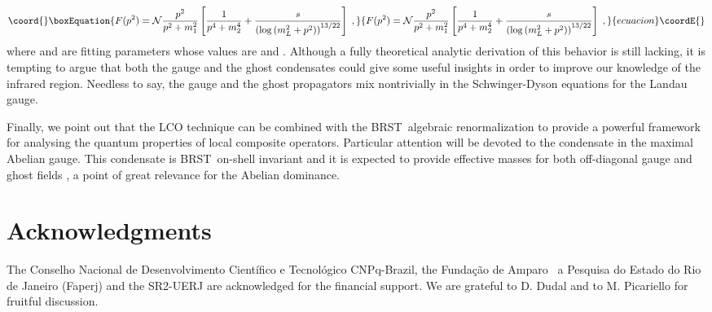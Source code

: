 \documentclass[a4paper,12pt]{article}
\begin{document}
\begin{equation}\coord{}\boxEquation{
F(p^{2})=\mathcal{N}\frac{p^{2}}{p^{2}+m_{1}^{2}}\left[ \frac{1}{
p^{4}+m_{2}^{4}}+\frac{s}{\left( \log \left( m_{L}^{2}+p^{2}\right) \right)
^{13/22}}\right] \;,  \label{fp}
}{
F(p^{2})=\mathcal{N}\frac{p^{2}}{p^{2}+m_{1}^{2}}\left[ \frac{1}{
p^{4}+m_{2}^{4}}+\frac{s}{\left( \log \left( m_{L}^{2}+p^{2}\right) \right)
^{13/22}}\right] \;,  }{ecuacion}\coordE{}\end{equation}
where \coordHE{}  \coordHE{}and \coordHE{}are fitting
parameters \cite{lg} whose values are \coordHE{}and \coordHE{}. Although a fully theoretical analytic derivation of this
behavior is still lacking, it is tempting to argue that both the gauge \coordHE{}and the ghost condensates \coordHE{} could give some useful insights
in order to improve our knowledge of the infrared region. Needless to say,
the gauge and the ghost propagators mix nontrivially in the Schwinger-Dyson
equations for the Landau gauge.

Finally, we point out that the LCO technique can be combined with the BRST\
algebraic renormalization to provide a powerful framework for analysing the
quantum properties of local composite operators. Particular attention will
be devoted to the condensate \myHighlight{$\left( \frac{1}{2}\left\langle AA\right\rangle
-\xi \left\langle c\overline{c}\right\rangle \right) $}\coordHE{} in the maximal
Abelian gauge. This condensate is BRST\ on-shell invariant and it is
expected to provide effective masses for both off-diagonal gauge and ghost
fields \cite{ope,dd}, a point of great relevance for the Abelian dominance. 

\section*{Acknowledgments}

The Conselho Nacional de Desenvolvimento Cient\'{i}fico e Tecnol\'{o}gico
CNPq-Brazil, the Funda{\c{c}}{\~{a}}o de Amparo {\ a Pesquisa do Estado do
Rio de Janeiro (Faperj) and the SR2-UERJ are acknowledged for the financial
support. We are grateful to D. Dudal and to M. Picariello for fruitful
discussion. }
\end{document}
